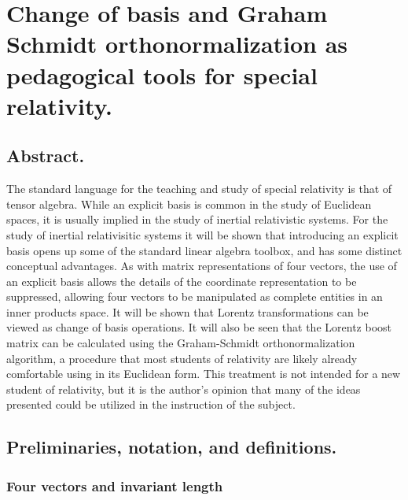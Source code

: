 
%

\chapter{Change of basis and Graham Schmidt orthonormalization as pedagogical tools for special relativity.}
\label{chap:grahamSchmidtLorentz}
{}
\date{April 14, 2011}

\beginArtWithToc

\section{Abstract.}

The standard language for the teaching and study of special relativity is that of tensor algebra.  
While an explicit basis is common in the study of Euclidean spaces, it is usually implied in the study of inertial relativistic systems.  
For the study of inertial relativisitic systems it will be shown that introducing an explicit basis opens up some of the standard linear algebra toolbox, and has some distinct conceptual advantages.
As with matrix representations of four vectors, the use of an explicit basis allows the details of the coordinate representation to be suppressed, allowing four vectors to be manipulated as complete entities in an inner products space.
It will be shown that Lorentz transformations can be viewed as change of basis operations.  It will also be seen that the Lorentz boost matrix can be calculated using the Graham-Schmidt orthonormalization algorithm, a procedure that most students of relativity are likely already comfortable using in its Euclidean form.
This treatment is not intended for a new student of relativity, but it is the author's opinion that many of the ideas presented could be utilized in the instruction of the subject.

\section{Preliminaries, notation, and definitions.}

\subsection{Four vectors and invariant length}

